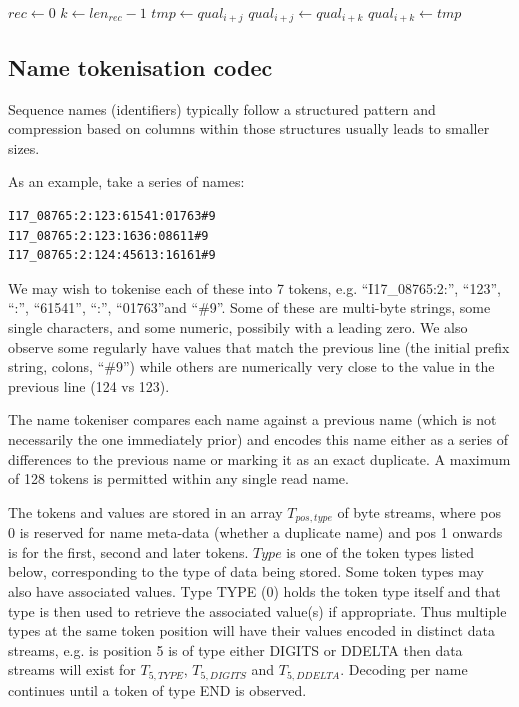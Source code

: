 \documentclass[a4paper]{article}
\begin{document}
\begin{algorithmic}[1]
\State $rec \gets 0$
    \State $k \gets len_{rec}-1$
      \State $tmp \gets qual_{i+j}$
      \State $qual_{i+j} \gets qual_{i+k}$
      \State $qual_{i+k} \gets tmp$
    \EndFor
  \EndIf
\EndFor
\EndProcedure
\end{algorithmic}


\subsection*{Name tokenisation codec}

Sequence names (identifiers) typically follow a structured pattern and
compression based on columns within those structures usually leads to
smaller sizes.

As an example, take a series of names:

\begin{verbatim}
I17_08765:2:123:61541:01763#9
I17_08765:2:123:1636:08611#9
I17_08765:2:124:45613:16161#9
\end{verbatim}

We may wish to tokenise each of these into 7 tokens, e.g.
``I17\_08765:2:'', ``123'', ``:'', ``61541'', ``:'', ``01763''and
``\#9''. Some of these are multi-byte strings, some single characters,
and some numeric, possibily with a leading zero.  We also observe some
regularly have values that match the previous line (the initial prefix
string, colons, ``\#9'') while others are numerically very close to the
value in the previous line (124 vs 123).

The name tokeniser compares each name against a previous name (which
is not necessarily the one immediately prior) and encodes this name
either as a series of differences to the previous name or marking it
as an exact duplicate.  A maximum of 128 tokens is permitted within
any single read name.

The tokens and values are stored in an array $T_{pos,type}$ of byte
streams, where pos 0 is reserved for name meta-data (whether a
duplicate name) and pos 1 onwards is for the first, second and later
tokens.  $Type$ is one of the token types listed below, corresponding
to the type of data being stored.  Some token types may also have
associated values.  Type TYPE (0) holds the token type itself and that
type is then used to retrieve the associated value(s) if appropriate.
Thus multiple types at the same token position will have their values
encoded in distinct data streams, e.g. is position 5 is of type either
DIGITS or DDELTA then data streams will exist for $T_{5,TYPE}$,
$T_{5,DIGITS}$ and $T_{5, DDELTA}$.  Decoding per name continues until
a token of type END is observed.
\end{document}
